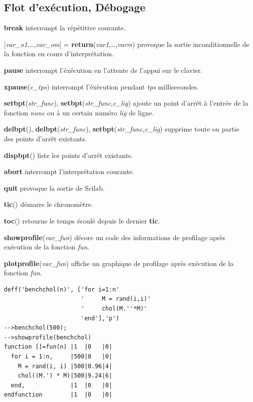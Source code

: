 \documentclass{article}
\begin{document}
\begin{multicols}{3}
\subsection*{Flot d'exécution, Débogage}
\begin{description}
\item{\textbf{break}} interrompt la répétitive courante.
\item{[\textit{var\_o1},\ldots,\textit{var\_om}] = \textbf{return}(\textit{var1},\ldots,\textit{varm})} provoque la sortie inconditionnelle de la fonction en cours d'interprétation.
\item{\textbf{pause}} interrompt l'éxécution en l'attente de l'appui sur le clavier.
\item{\textbf{xpause}(\textit{c\_tps})} interrompt l'éxécution pendant \textit{tps} millisecondes.
\item{\textbf{setbpt}(\textit{str\_func}), \textbf{setbpt}(\textit{str\_func},\textit{c\_lig})} ajoute un point d'arrêt à l'entrée de la fonction \textit{nunc} ou à un certain numéro \textit{lig} de ligne.
\item{\textbf{delbpt}(), \textbf{delbpt}(\textit{str\_func}), \textbf{setbpt}(\textit{str\_func},\textit{c\_lig})} supprime toute ou partie des points d'arrêt existants.
\item{\textbf{dispbpt}()} liste les points d'arrêt existants.
\item{\textbf{abort}} interrompt l'interprétation courante.
\item{\textbf{quit}} provoque la sortie de Scilab.
\item{\textbf{tic}()} démarre le chronomètre.
\item{\textbf{toc}()} retourne le temps écoulé depuis le dernier \textbf{tic}.
\item{\textbf{showprofile}(\textit{var\_fun})} décore un code des informations de  profilage après exécution de la fonction \textit{fun}.
\item{\textbf{plotprofile}(\textit{var\_fun})} affiche un graphique de profilage après exécution de la fonction \textit{fun}.
\begin{verbatim}
deff('benchchol(n)', ['for i=1:n'
                      '     M = rand(i,i)'
                      '     chol(M.''*M)'
                      'end'],'p')
-->benchchol(500);
-->showprofile(benchchol)
function []=fun(n) |1  |0   |0|
  for i = 1:n,     |500|0   |0|
    M = rand(i, i) |500|0.96|4|
    chol((M.') * M)|500|9.24|6|
  end,             |1  |0   |0|
endfunction        |1  |0   |0|
\end{verbatim}
\end{description}

\section*{}

\end{multicols}
\end{document}

